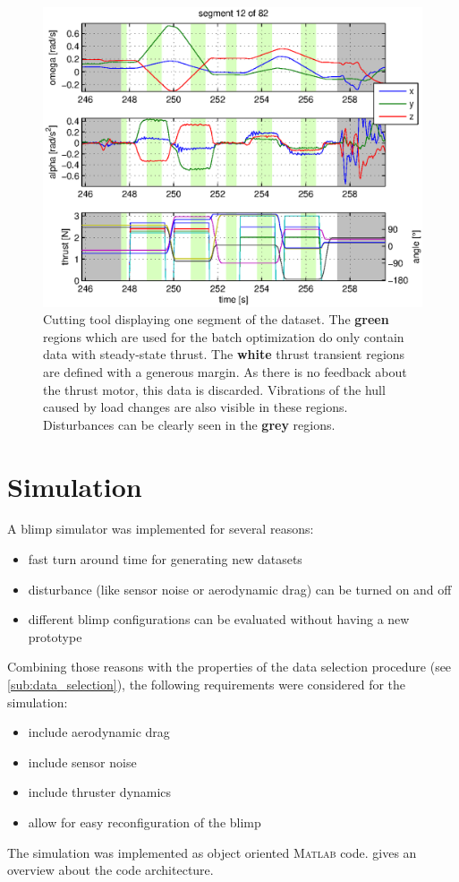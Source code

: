 \begin{figure}[htbp]
\captionsetup{width=0.9\textwidth}
\centering
\includegraphics[scale=0.8]{images/interactive_cut/interactive_cut_detail_modified.eps}
\caption{Cutting tool displaying one segment of the dataset. 
The \textbf{green} regions which are used for the batch optimization do only contain data with steady-state thrust. 
The \textbf{white} thrust transient regions are defined with a generous margin.
As there is no feedback about the thrust motor, this data is discarded.
Vibrations of the hull caused by load changes are also visible in these regions.
Disturbances can be clearly seen in the \textbf{grey} regions.
}
\label{fig:data_selection_short}
\end{figure}

\section{Simulation}
\label{sec:simulation}
A blimp simulator was implemented for several reasons:
\begin{itemize}
\item fast turn around time for generating new datasets
\item disturbance (like sensor noise or aerodynamic drag) can be turned on and off
\item different blimp configurations can be evaluated without having a new prototype
\end{itemize}

Combining those reasons with the properties of the data selection procedure (see \cref{sub:data_selection}), the following requirements were considered for the simulation:
\begin{itemize}
\item include aerodynamic drag
\item include sensor noise
\item include thruster dynamics
\item allow for easy reconfiguration of the blimp
\end{itemize}
The simulation was implemented as object oriented \textsc{Matlab} code.
 gives an overview about the code architecture.

